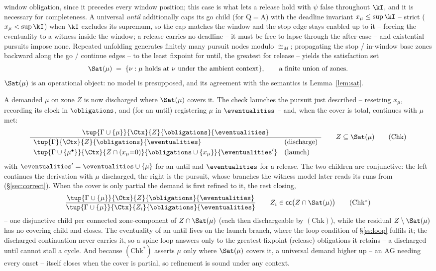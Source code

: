 window obligation, since it precedes every window position; this case is what lets a release hold with $\psi$
false throughout $\kI$, and it is necessary for completeness. A universal \emph{until} additionally caps its
go child (for $\mathrm{Q}=\mathrm{A}$) with the deadline invariant $x_\mu\le\sup\kI$ -- strict
($x_\mu<\sup\kI$) when $\kI$ excludes its supremum, so the cap matches the window and the stop edge stays
enabled up to it -- forcing the eventuality to a witness inside the window; a release carries no deadline -- it
must be free to lapse through the after-case -- and existential pursuits impose none. Repeated
unfolding generates finitely many pursuit nodes modulo $\cong_M$; propagating the stop / in-window base zones
backward along the go / continue edges -- to the least fixpoint for until, the greatest for release -- yields
the {satisfaction set}
\[
\Sat(\mu)\;=\;\{\nu : \text{$\mu$ holds at $\nu$ under the ambient context}\},
\qquad\text{a finite union of zones.}
\]
$\Sat(\mu)$ is an {operational} object: no model is presupposed, and its agreement with the semantics is
Lemma~\ref{lem:sat}.

A demanded $\mu$ on zone $Z$ is now discharged where $\Sat(\mu)$ covers it. The check {launches} the
pursuit just described -- resetting $x_\mu$, recording its clock in $\obligations$, and (for an until)
registering $\mu$ in $\eventualities$ -- and, when the cover is total, continues with $\mu$ met:
\[
\frac{\tup{\Gamma\cup\{\mu\}}{\Ctx}{Z}{\obligations}{\eventualities}}
{\begin{array}{ll}
\tup{\Gamma}{\Ctx}{Z}{\obligations}{\eventualities} & (\text{discharge})\\[3pt]
\tup{\Gamma\cup\{\mu^\bullet\}}{\Ctx}{Z\cap(x_\mu{=}0)}{\obligations\cup\{x_\mu\}}{\eventualities'} & (\text{launch})
\end{array}}
\qquad Z\subseteq\Sat(\mu)
\tag{\textrm{Chk}}\label{tag:chk}
\]
with $\eventualities'=\eventualities\cup\{\mu\}$ for an until and $\eventualities$ for a release. The two
children are conjunctive: the left continues the derivation with $\mu$ discharged, the right {is} the
pursuit, whose branches the witness model later reads its runs from (\S\ref{sec:correct}). When the cover is
only partial the demand is first refined to it, the rest closing,
\[
\frac{\tup{\Gamma\cup\{\mu\}}{\Ctx}{Z}{\obligations}{\eventualities}}
{\tup{\Gamma\cup\{\mu\}}{\Ctx}{Z_i}{\obligations}{\eventualities}}
\qquad Z_i\in\mathsf{cc}\big(Z\cap\Sat(\mu)\big)
\tag{\textrm{Chk}$^{*}$}\label{tag:chkstar}
\]
-- one disjunctive child per connected zone-component of $Z\cap\Sat(\mu)$ (each then dischargeable by
$(\mathrm{Chk})$), while the residual $Z\setminus\Sat(\mu)$ has no covering child and closes. The eventuality
of an until lives on the launch branch, where the loop condition of \S\ref{ss:loop} fulfils it; the discharged
continuation never carries it, so a spine loop answers only to the greatest-fixpoint (release) obligations it
retains -- a discharged until cannot stall a cycle. And because $(\mathrm{Chk}^{*})$ asserts $\mu$ only where
$\Sat(\mu)$ covers it, a universal demand higher up -- an $\mathrm{AG}$ needing {every} onset -- itself
closes when the cover is partial, so refinement is sound under any context.

